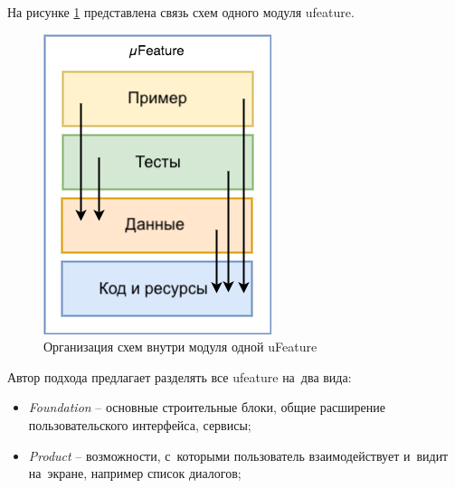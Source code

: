На рисунке \ref{sec:analysis:research:mobArch:ufeature:featureDependencyDiagram} представлена связь схем одного модуля \gls{ufeature}.

\begin{figure}[h]
  \centering
    \includegraphics{inc/img/ufeature-diagram.png}
  \caption{Организация схем внутри модуля одной uFeature}
  \label{sec:analysis:research:mobArch:ufeature:featureDependencyDiagram}
\end{figure}

Автор подхода предлагает разделять все \gls{ufeature} на~два вида:

\begin{itemize}
	\item \emph{Foundation} -- основные строительные блоки, общие расширение пользовательского интерфейса, сервисы;
	\item \emph{Product} -- возможности, с~которыми пользователь взаимодействует и~видит на~экране, например список диалогов;
\end{itemize}

